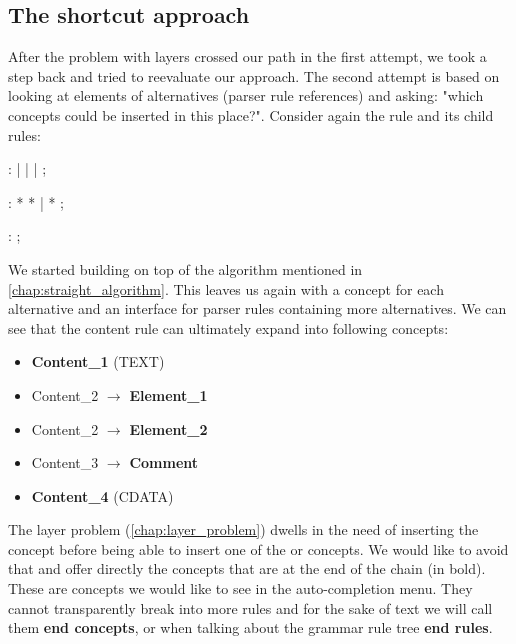 \subsection{The shortcut approach}
\label{chap:shortcut_approach}

After the problem with layers crossed our path in the first attempt, we took a step back and tried to reevaluate our approach.
The second attempt is based on looking at elements of alternatives (parser rule references) and asking: "which concepts could be inserted in this place?".
Consider again the  rule and its child rules:

\begin{antlr}
	    :   
           |   
           |   
           |   
           ;

	    :   \literal{<}  * \literal{>} * \literal{</}  \literal{>}
           |   \literal{<}  * \literal{/>}
           ;

	    :   \literal{<!--}  \literal{-->} ;
\end{antlr}

We started building on top of the algorithm mentioned in \ref{chap:straight_algorithm}.
This leaves us again with a concept for each alternative and an interface for parser rules containing more alternatives.
We can see that the content rule can ultimately expand into following concepts:

\begin{itemize}
	\itemsep0em
	\item \textbf{Content{\_}1} (TEXT)
	\item Content{\_}2 $\rightarrow$ \textbf{Element{\_}1}
	\item Content{\_}2 $\rightarrow$ \textbf{Element{\_}2}
	\item Content{\_}3 $\rightarrow$ \textbf{Comment}
	\item \textbf{Content{\_}4} (CDATA)
\end{itemize}

The layer problem (\ref{chap:layer_problem}) dwells in the need of inserting the  concept before being able to insert one of the  or  concepts.
We would like to avoid that and offer directly the concepts that are at the end of the chain (in bold).
These are concepts we would like to see in the auto-completion menu.
They cannot transparently break into more rules and for the sake of text we will call them \textbf{end concepts}, or when talking about the grammar rule tree \textbf{end rules}.
\\

